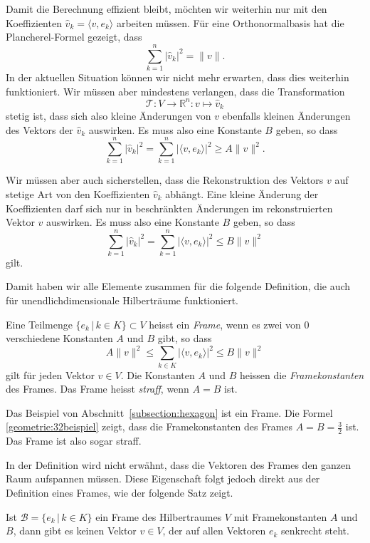 Damit die Berechnung effizient bleibt, möchten wir weiterhin nur mit den
Koeffizienten $\hat{v}_k = \langle v,e_k\rangle$ arbeiten müssen.
Für eine Orthonormalbasis hat die Plancherel-Formel gezeigt, dass
\[
\sum_{k=1}^n |\hat{v}_k|^2 = \| v \|.
\]
In der aktuellen Situation können wir nicht mehr erwarten, dass dies 
weiterhin funktioniert.
Wir müssen aber mindestens verlangen, dass die Transformation
\[
\mathcal{T}
\colon
V\to \mathbb R^n
:
v\mapsto \hat{v}_k
\]
stetig ist, dass sich also kleine Änderungen von $v$ ebenfalls
kleinen Änderungen des Vektors der $\hat{v}_k$ auswirken.
Es muss also eine Konstante $B$ geben, so dass
\[
\sum_{k=1}^n |\hat{v}_k|^2
=
\sum_{k=1}^n |\langle v,e_k\rangle|^2
\ge
A \| v \|^2.
\]

Wir müssen aber auch sicherstellen, dass die Rekonstruktion des Vektors $v$
auf stetige Art von den Koeffizienten $\hat{v}_k$ abhängt. 
Eine kleine Änderung der Koeffizienten darf sich nur in beschränkten Änderungen
im rekonstruierten Vektor $v$ auswirken.
Es muss also eine Konstante $B$ geben, so dass
\[
\sum_{k=1}^n |\hat{v}_k|^2
=
\sum_{k=1}^n |\langle v,e_k\rangle|^2
\le
B \| v \|^2
\]
gilt.

Damit haben wir alle Elemente zusammen für die folgende Definition,
die auch für unendlichdimensionale Hilberträume funktioniert.

\begin{definition}
\label{definition:frame}
Eine Teilmenge $\{ e_k\,|\, k\in K\}\subset V$ heisst ein {\em Frame},
wenn es zwei von $0$ verschiedene Konstanten $A$ und $B$ gibt, so dass
\[
A\|v\|^2 \le \sum_{k\in K} |\langle v, e_k\rangle|^2 \le B \| v\|^2
\]
gilt für jeden Vektor $v\in V$.
Die Konstanten $A$ und $B$ heissen die {\em Framekonstanten} des Frames.
Das Frame heisst {\em straff}, wenn $A=B$ ist.
\end{definition}

\begin{beispiel}
Das Beispiel von Abschnitt~\ref{subsection:hexagon} ist ein Frame.
Die Formel \eqref{geometrie:32beispiel} zeigt, dass die Framekonstanten
des Frames $A=B=\frac32$ ist.
Das Frame ist also sogar straff.
\end{beispiel}

In der Definition wird nicht erwähnt, dass die Vektoren des Frames den
ganzen Raum aufspannen müssen.
Diese Eigenschaft folgt jedoch direkt aus der Definition eines Frames,
wie der folgende Satz zeigt.

\begin{satz}
Ist $\mathcal{B}=\{ e_k\,|\, k\in K\}$ ein Frame des Hilbertraumes $V$
mit Framekonstanten $A$ und $B$, dann gibt es keinen Vektor $v\in V$,
der auf allen Vektoren $e_k$ senkrecht steht.
\end{satz}

